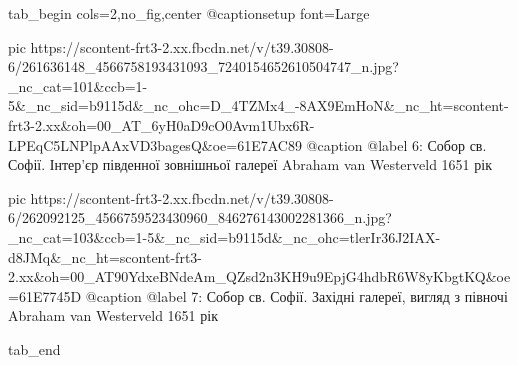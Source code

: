  
 
 
 
 


\ifcmt
  tab_begin cols=2,no_fig,center
     @captionsetup font=Large

     pic https://scontent-frt3-2.xx.fbcdn.net/v/t39.30808-6/261636148_4566758193431093_7240154652610504747_n.jpg?_nc_cat=101&ccb=1-5&_nc_sid=b9115d&_nc_ohc=D_4TZMx4_-8AX9EmHoN&_nc_ht=scontent-frt3-2.xx&oh=00_AT_6yH0aD9cO0Avm1Ubx6R-LPEqC5LNPlpAAxVD3bagesQ&oe=61E7AC89
     @caption @label 6: Собор св. Софії. Інтер'єр південної зовнішньої галереї Abraham van Westerveld 1651 рік

     pic https://scontent-frt3-2.xx.fbcdn.net/v/t39.30808-6/262092125_4566759523430960_846276143002281366_n.jpg?_nc_cat=103&ccb=1-5&_nc_sid=b9115d&_nc_ohc=tlerIr36J2IAX-d8JMq&_nc_ht=scontent-frt3-2.xx&oh=00_AT90YdxeBNdeAm_QZsd2n3KH9u9EpjG4hdbR6W8yKbgtKQ&oe=61E7745D
     @caption @label 7: Собор св. Софії. Західні галереї, вигляд з півночі Abraham van Westerveld 1651 рік

  tab_end
\fi
